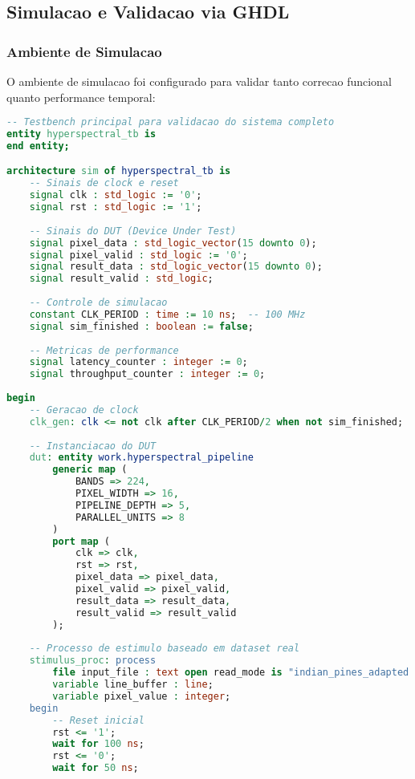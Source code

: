 \subsection{Simulacao e Validacao via GHDL}

\subsubsection{Ambiente de Simulacao}
O ambiente de simulacao foi configurado para validar tanto correcao funcional quanto performance temporal:

\begin{lstlisting}[language=VHDL]
-- Testbench principal para validacao do sistema completo
entity hyperspectral_tb is
end entity;

architecture sim of hyperspectral_tb is
    -- Sinais de clock e reset
    signal clk : std_logic := '0';
    signal rst : std_logic := '1';
    
    -- Sinais do DUT (Device Under Test)
    signal pixel_data : std_logic_vector(15 downto 0);
    signal pixel_valid : std_logic := '0';
    signal result_data : std_logic_vector(15 downto 0);
    signal result_valid : std_logic;
    
    -- Controle de simulacao
    constant CLK_PERIOD : time := 10 ns;  -- 100 MHz
    signal sim_finished : boolean := false;
    
    -- Metricas de performance
    signal latency_counter : integer := 0;
    signal throughput_counter : integer := 0;
    
begin
    -- Geracao de clock
    clk_gen: clk <= not clk after CLK_PERIOD/2 when not sim_finished;
    
    -- Instanciacao do DUT
    dut: entity work.hyperspectral_pipeline
        generic map (
            BANDS => 224,
            PIXEL_WIDTH => 16,
            PIPELINE_DEPTH => 5,
            PARALLEL_UNITS => 8
        )
        port map (
            clk => clk,
            rst => rst,
            pixel_data => pixel_data,
            pixel_valid => pixel_valid,
            result_data => result_data,
            result_valid => result_valid
        );
    
    -- Processo de estimulo baseado em dataset real
    stimulus_proc: process
        file input_file : text open read_mode is "indian_pines_adapted.txt";
        variable line_buffer : line;
        variable pixel_value : integer;
    begin
        -- Reset inicial
        rst <= '1';
        wait for 100 ns;
        rst <= '0';
        wait for 50 ns;
        

\end{lstlisting}
